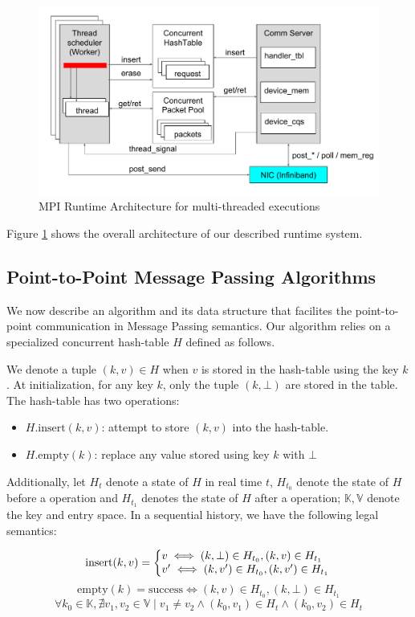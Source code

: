 \documentclass[11pt]{article}
\begin{document}
\begin{figure}
  \centering
  \includegraphics[width=\textwidth]{fig/runtime.pdf}
  \caption{MPI Runtime Architecture for multi-threaded executions}\label{fig:overall}
\end{figure}

Figure \ref{fig:overall} shows the overall architecture of our described
runtime system.

\subsection{Point-to-Point Message Passing Algorithms}
We now describe an algorithm and its data structure that facilites the
point-to-point communication in Message Passing semantics. Our algorithm relies
on a specialized concurrent hash-table $H$ defined as follows.

We denote a tuple $(k,v) \in H$ when $v$ is stored in the hash-table using the
key $k$. At initialization, for any key $k$, only the tuple $(k,\bot)$ are
stored in the table. The hash-table has two operations: 

\begin{itemize}
  \item $H.\text{insert}(k,v)$: attempt to store $(k,v)$ into the hash-table.
  \item $H.\text{empty}(k)$: replace any value stored using key $k$ with $\bot$
\end{itemize}

Additionally, let $H_t$ denote a state of $H$ in real time $t$, $H_{t_0}$ denote the
state of $H$ before a operation and $H_{t_1}$ denotes the state of $H$ after a
operation; $\mathbb{K}, \mathbb{V}$ denote the key and entry space. In a
sequential history, we have the following legal semantics:

\[
  \text{insert}(k, v) = \left\{
    \begin{array}{@{}l@{\thinspace}l}
      v \iff (k,\bot) \in H_{t_0}, (k,v) \in H_{t_1}\\
      v' \iff (k,v') \in H_{t_0}, (k,v') \in H_{t_1}
    \end{array}
    \right.
\]
\[
  \text{empty}(k) = \text{success} \iff  (k,v) \in H_{t_0}, (k,\bot) \in H_{t_1}
\]
\[
  \forall k_0 \in \mathbb{K}, \nexists {v_1, v_2 \in \mathbb{V}}
    \mid {{v_1 \ne v_2} \wedge {(k_0, v_1) \in H_{t} \wedge (k_0, v_2) \in H_{t}}}
\]
\end{document}
